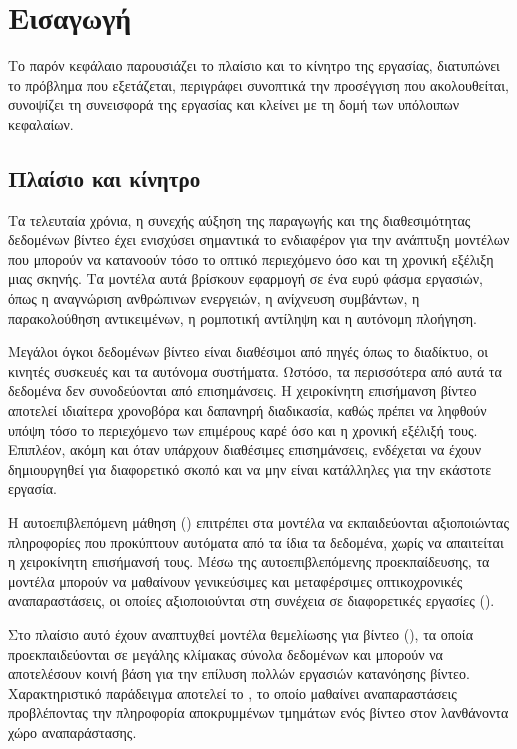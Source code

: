 \chapter{Εισαγωγή}
\label{ch:intro}

Το παρόν κεφάλαιο παρουσιάζει το πλαίσιο και το κίνητρο της εργασίας, διατυπώνει το πρόβλημα που εξετάζεται, περιγράφει συνοπτικά την προσέγγιση που ακολουθείται, συνοψίζει τη συνεισφορά της εργασίας και κλείνει με τη δομή των υπόλοιπων κεφαλαίων.

\section{Πλαίσιο και κίνητρο}
\label{sec:intro-motivation}

Τα τελευταία χρόνια, η συνεχής αύξηση της παραγωγής και της διαθεσιμότητας
δεδομένων βίντεο έχει ενισχύσει σημαντικά το ενδιαφέρον για την ανάπτυξη μοντέλων
που μπορούν να κατανοούν τόσο το οπτικό περιεχόμενο όσο και τη χρονική εξέλιξη
μιας σκηνής. Τα μοντέλα αυτά βρίσκουν εφαρμογή σε ένα ευρύ φάσμα εργασιών, όπως
η αναγνώριση ανθρώπινων ενεργειών, η ανίχνευση συμβάντων, η παρακολούθηση
αντικειμένων, η ρομποτική αντίληψη και η αυτόνομη πλοήγηση.

Μεγάλοι όγκοι δεδομένων βίντεο είναι διαθέσιμοι από πηγές όπως το διαδίκτυο,
οι κινητές συσκευές και τα αυτόνομα συστήματα. Ωστόσο, τα περισσότερα από αυτά
τα δεδομένα δεν συνοδεύονται από επισημάνσεις. Η χειροκίνητη
επισήμανση βίντεο αποτελεί ιδιαίτερα χρονοβόρα και δαπανηρή διαδικασία, καθώς
πρέπει να ληφθούν υπόψη τόσο το περιεχόμενο των επιμέρους καρέ όσο και η χρονική
εξέλιξή τους. Επιπλέον, ακόμη και όταν υπάρχουν διαθέσιμες επισημάνσεις, ενδέχεται
να έχουν δημιουργηθεί για διαφορετικό σκοπό και να μην είναι κατάλληλες για την
εκάστοτε εργασία.

Η αυτοεπιβλεπόμενη μάθηση () επιτρέπει στα
μοντέλα να εκπαιδεύονται αξιοποιώντας πληροφορίες που προκύπτουν αυτόματα από
τα ίδια τα δεδομένα, χωρίς να απαιτείται η χειροκίνητη επισήμανσή τους. Μέσω της αυτοεπιβλεπόμενης προεκπαίδευσης, τα μοντέλα
μπορούν να μαθαίνουν γενικεύσιμες και μεταφέρσιμες οπτικοχρονικές αναπαραστάσεις,
οι οποίες αξιοποιούνται στη συνέχεια σε διαφορετικές εργασίες
().

Στο πλαίσιο αυτό έχουν αναπτυχθεί μοντέλα θεμελίωσης για βίντεο
(), τα οποία προεκπαιδεύονται σε μεγάλης κλίμακας
σύνολα δεδομένων και μπορούν να αποτελέσουν κοινή βάση για την επίλυση πολλών
εργασιών κατανόησης βίντεο. Χαρακτηριστικό παράδειγμα αποτελεί το \cite{adrien2023v-jepa},
το οποίο μαθαίνει αναπαραστάσεις προβλέποντας την πληροφορία αποκρυμμένων
τμημάτων ενός βίντεο στον λανθάνοντα χώρο αναπαράστασης.

